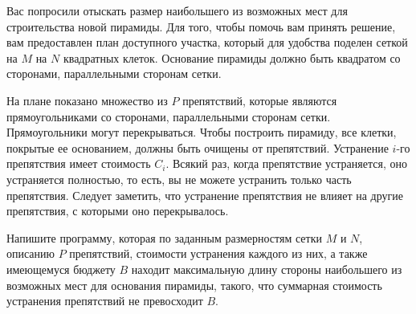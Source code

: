 Вас попросили отыскать размер наибольшего из возможных мест для строительства новой
пирамиды. Для того, чтобы помочь вам принять решение, вам предоставлен план доступного
участка, который для удобства поделен сеткой на $M$ на $N$ квадратных клеток. Основание пирамиды должно быть квадратом со сторонами, параллельными сторонам сетки.

На плане показано множество из $P$ препятствий, которые являются прямоугольниками со
сторонами, параллельными сторонам сетки. Прямоугольники могут перекрываться. Чтобы
построить пирамиду, все клетки, покрытые ее основанием, должны быть очищены от препятствий.
Устранение $i$-го препятствия имеет стоимость $C_i$. Всякий раз, когда препятствие устраняется, оно устраняется полностью, то есть, вы не можете устранить только часть препятствия. Следует заметить, что устранение препятствия не влияет на другие препятствия, с которыми оно
перекрывалось. 

Напишите программу, которая по заданным размерностям сетки $M$ и $N$, описанию $P$ препятствий, стоимости устранения каждого из них, а также имеющемуся бюджету $B$ находит максимальную длину стороны наибольшего из возможных мест для основания пирамиды, такого, что суммарная стоимость устранения препятствий не превосходит $B$. 